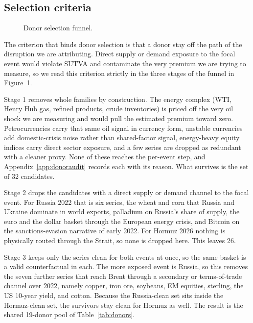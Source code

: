 \subsection{Selection criteria}
\begin{figure}[h]
\centering
\caption{Donor selection funnel.}
\label{fig:waterfall}

\end{figure}
The criterion that binds donor selection is that a donor stay off the path of the disruption
we are attributing. Direct supply or demand exposure to the focal event would violate SUTVA
and contaminate the very premium we are trying to measure, so we read this criterion strictly
in the three stages of the funnel in Figure~\ref{fig:waterfall}.

Stage 1 removes whole families by construction. The energy complex (WTI, Henry Hub
gas, refined products, crude inventories) is priced off the very oil shock we are measuring
and would pull the estimated premium toward zero. Petrocurrencies carry that same oil signal
in currency form, unstable currencies add domestic-crisis noise rather than shared-factor
signal, energy-heavy equity indices carry direct sector exposure, and a few series are
dropped as redundant with a cleaner proxy. None of these reaches the per-event step, and
Appendix~\ref{app:donoraudit} records each with its reason. What survives is the set of 32
candidates.

Stage 2 drops the candidates with a direct supply or demand channel to the focal
event. For Russia 2022 that is six series, the wheat and corn that Russia and Ukraine
dominate in world exports, palladium on Russia's share of supply, the euro and the dollar
basket through the European energy crisis, and Bitcoin on the sanctions-evasion narrative of
early 2022. For Hormuz 2026 nothing is physically routed through the Strait, so none is
dropped here. This leaves 26.

Stage 3 keeps only the series clean for both events at once, so the same basket is a
valid counterfactual in each. The more exposed event is Russia, so this removes the seven
further series that reach Brent through a secondary or terms-of-trade channel over 2022,
namely copper, iron ore, soybeans, EM equities, sterling, the US 10-year yield, and cotton.
Because the Russia-clean set sits inside the Hormuz-clean set, the survivors stay clean for
Hormuz as well. The result is the shared 19-donor pool of Table~\ref{tab:donors}.

